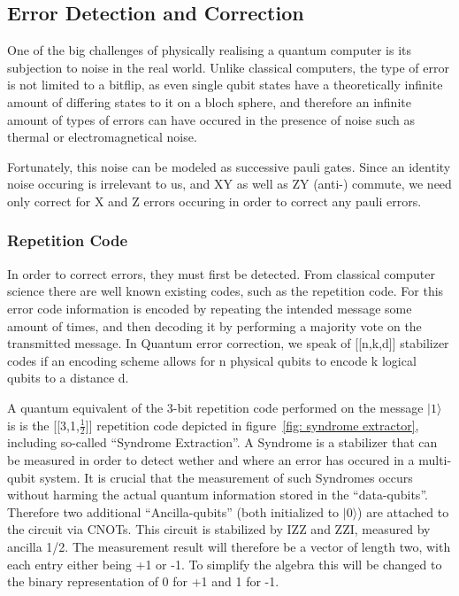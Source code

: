 \subsection{Error Detection and Correction}
One of the big challenges of physically realising a quantum 
computer is its subjection to noise in the real world.
Unlike classical computers, the type of error is not limited
to a bitflip, as even single qubit states have a theoretically
infinite amount of differing states to it on a bloch sphere,
and therefore an infinite amount of types of errors can have
occured in the presence of noise such as thermal or electromagnetical
noise.

Fortunately, this noise can be modeled as successive pauli gates.
Since an identity noise occuring is irrelevant to us, and XY as
well as ZY (anti-) commute, we need only correct for X and Z
errors occuring in order to correct any pauli errors. 

\subsubsection{Repetition Code}
In order to correct errors, they must first be detected.
From classical computer science there are well known existing
codes, such as the repetition code.
For this error code information is encoded by repeating the 
intended message some amount of times, and then decoding it
by performing a majority vote on the transmitted message.
In Quantum error correction, we speak of [[n,k,d]] stabilizer
codes if an encoding scheme allows for n physical qubits to 
encode k logical qubits to a distance d.

A quantum equivalent of the 3-bit repetition code performed on
the message $|1\rangle$ is is the [[3,1,$\frac{1}{2}$]] repetition
code depicted in 
figure~\ref{fig: syndrome extractor}, including so-called
``Syndrome Extraction''. A Syndrome is a stabilizer that can be
measured in order to detect wether and where an error has occured
in a multi-qubit system. It is crucial that the 
measurement of such Syndromes occurs without harming the actual
quantum information stored in the ``data-qubits''. Therefore
two additional ``Ancilla-qubits'' (both initialized to 
$|0\rangle$) are attached to the circuit via CNOTs.
This circuit is stabilized by IZZ and ZZI, measured by ancilla 
1/2. The measurement result will therefore be a vector of length
two, with each entry either being +1 or -1. To simplify the 
algebra this will be changed to the binary representation of 0 
for +1 and 1 for -1. 

